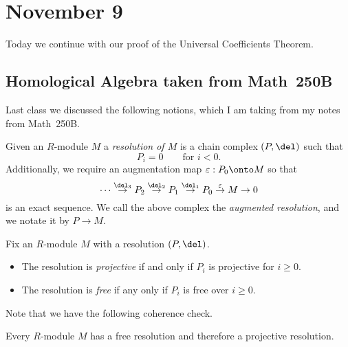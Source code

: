 \documentclass[../notes.tex]{subfiles}
\begin{document}
\section{November 9}

Today we continue with our proof of the Universal Coefficients Theorem.

\subsection{Homological Algebra taken from Math~250B}
Last class we discussed the following notions, which I am taking from my notes from Math~250B.
\begin{definition}[resolution] \label{def:resolution}
	Given an $R$-module $M$ a \textit{resolution of $M$} is a chain complex $(P,\del)$ such that
	\[P_i=0\qquad\text{for }i<0.\]
	Additionally, we require an augmentation map $\varepsilon:P_0\onto M$ so that
	\[\cdots\stackrel{\del_3}\to P_2\stackrel{\del_2}\to P_1\stackrel{\del_1}\to P_0\stackrel{\varepsilon}\to M\to 0\]
	is an exact sequence. We call the above complex the \textit{augmented resolution}, and we notate it by $P\to M$.
\end{definition}
\begin{defi}
	Fix an $R$-module $M$ with a resolution $(P,\del)$.
	\begin{itemize}
		\item The resolution is \textit{projective} if and only if $P_i$ is projective for $i\ge0$.
		\item The resolution is \textit{free} if any only if $P_i$ is free over $i\ge0$.
	\end{itemize}
\end{defi}
Note that we have the following coherence check.
\begin{lemma} \label{lem:enoughprojectives}
	Every $R$-module $M$ has a free resolution and therefore a projective resolution.
\end{lemma}
\end{document}
